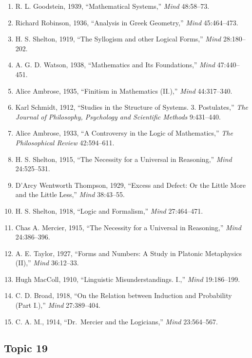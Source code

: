\documentclass[
]{article}
\begin{document}
\begin{enumerate}
\def\labelenumi{\arabic{enumi}.}
\item
  R. L. Goodstein, 1939, ``Mathematical Systems,'' \emph{Mind}
  48:58--73.
\item
  Richard Robinson, 1936, ``Analysis in Greek Geometry,'' \emph{Mind}
  45:464--473.
\item
  H. S. Shelton, 1919, ``The Syllogism and other Logical Forms,''
  \emph{Mind} 28:180--202.
\item
  A. G. D. Watson, 1938, ``Mathematics and Its Foundations,''
  \emph{Mind} 47:440--451.
\item
  Alice Ambrose, 1935, ``Finitism in Mathematics (II.),'' \emph{Mind}
  44:317--340.
\item
  Karl Schmidt, 1912, ``Studies in the Structure of Systems. 3.
  Postulates,'' \emph{The Journal of Philosophy, Psychology and
  Scientific Methods} 9:431--440.
\item
  Alice Ambrose, 1933, ``A Controversy in the Logic of Mathematics,''
  \emph{The Philosophical Review} 42:594--611.
\item
  H. S. Shelton, 1915, ``The Necessity for a Universal in Reasoning,''
  \emph{Mind} 24:525--531.
\item
  D'Arcy Wentworth Thompson, 1929, ``Excess and Defect: Or the Little
  More and the Little Less,'' \emph{Mind} 38:43--55.
\item
  H. S. Shelton, 1918, ``Logic and Formalism,'' \emph{Mind} 27:464--471.
\item
  Chas A. Mercier, 1915, ``The Necessity for a Universal in Reasoning,''
  \emph{Mind} 24:386--396.
\item
  A. E. Taylor, 1927, ``Forms and Numbers: A Study in Platonic
  Metaphysics (II),'' \emph{Mind} 36:12--33.
\item
  Hugh MacColl, 1910, ``Linguistic Misunderstandings. I.,'' \emph{Mind}
  19:186--199.
\item
  C. D. Broad, 1918, ``On the Relation between Induction and Probability
  (Part I.),'' \emph{Mind} 27:389--404.
\item
  C. A. M., 1914, ``Dr.~Mercier and the Logicians,'' \emph{Mind}
  23:564--567.
\end{enumerate}

\newpage

\hypertarget{topic-19}{%
\subsection{Topic 19}\label{topic-19}}
\end{document}
